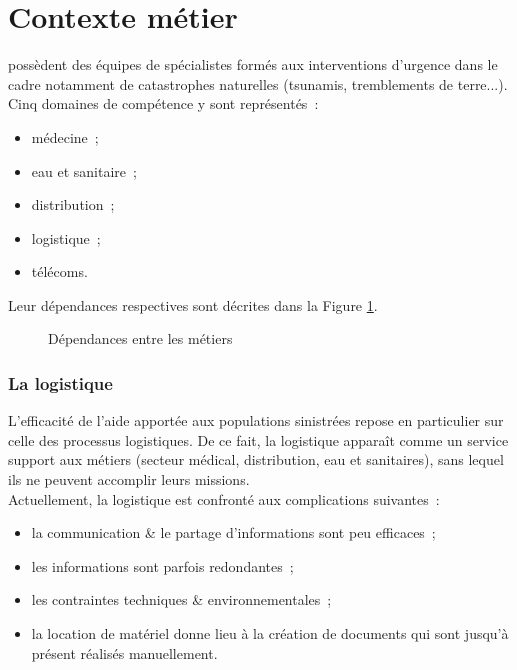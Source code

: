 \section{Contexte métier}
\mo possèdent des équipes de spécialistes formés aux interventions d'urgence dans le cadre notamment de catastrophes naturelles (tsunamis, tremblements de terre...).
Cinq domaines de compétence y sont représentés~:
\begin{itemize}
	\item médecine~;
	\item eau et sanitaire~;
	\item distribution~;
	\item logistique~;
	\item télécoms.
\end{itemize}
Leur dépendances respectives sont décrites dans la Figure \ref{dep}.
\begin{figure}[htbp]
	\centering
	\caption{Dépendances entre les métiers}
	\label{dep}
\end{figure}

\subsubsection{La logistique}
L'efficacité de l'aide apportée aux populations sinistrées repose en particulier sur celle des processus logistiques. De ce fait, la logistique apparaît comme un service support aux métiers (secteur médical, distribution, eau et sanitaires), sans lequel ils ne peuvent accomplir leurs missions.
\\
Actuellement, la logistique est confronté aux complications suivantes~:
\begin{itemize}
	\item la communication \& le partage d'informations sont peu efficaces~;
	\item les informations sont parfois redondantes~;
	\item les contraintes techniques \& environnementales~;
	\item la location de matériel donne lieu à la création de documents qui sont jusqu'à présent réalisés manuellement.
\end{itemize}

